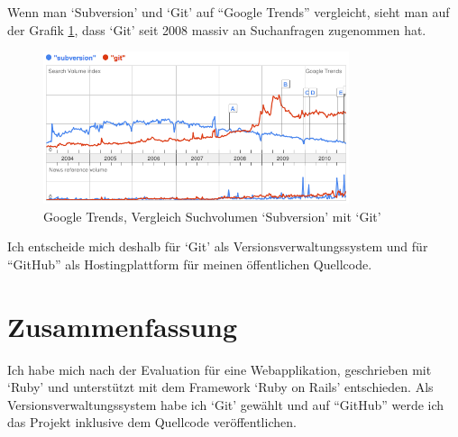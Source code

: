 Wenn man `Subversion' und `Git' auf ``Google Trends'' vergleicht, sieht man auf
der Grafik \ref{svn_vs_git}, dass `Git' seit 2008 massiv an Suchanfragen zugenommen
hat.

\begin{figure}[ht]
    \begin{center}
        \includegraphics[width=0.8\textwidth,angle=0]{./bilder/svn_vs_git.png}
        \caption{Google Trends, Vergleich Suchvolumen `Subversion' mit `Git'}
        \label{svn_vs_git}
    \end{center}
\end{figure}

Ich entscheide mich deshalb für `Git' als Versionsverwaltungssystem und für ``GitHub''
als Hostingplattform für meinen öffentlichen Quellcode.

\section{Zusammenfassung}
Ich habe mich nach der Evaluation für eine Webapplikation, geschrieben mit `Ruby'
und unterstützt mit dem Framework `Ruby on Rails' entschieden. Als Versionsverwaltungssystem
habe ich `Git' gewählt und auf ``GitHub'' werde ich das Projekt inklusive dem Quellcode
veröffentlichen.